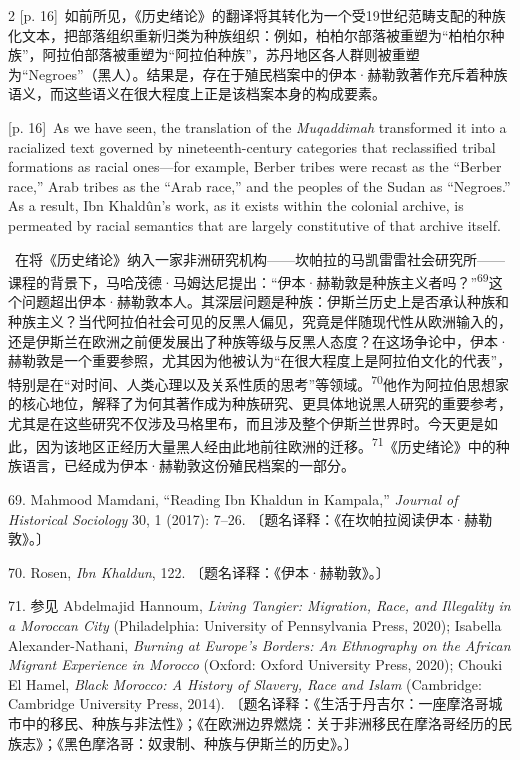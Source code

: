 \documentclass[10pt,a4paper]{article}
\begin{document}
\begin{paracol}{2}
{\scriptsize\color{gray} [p. 16]}\ 如前所见，《历史绪论》的翻译将其转化为一个受19世纪范畴支配的种族化文本，把部落组织重新归类为种族组织：例如，柏柏尔部落被重塑为“柏柏尔种族”，阿拉伯部落被重塑为“阿拉伯种族”，苏丹地区各人群则被重塑为“Negroes”（黑人）。结果是，存在于殖民档案中的伊本·赫勒敦著作充斥着种族语义，而这些语义在很大程度上正是该档案本身的构成要素。\par
\switchcolumn
{\scriptsize\color{gray} [p. 16]}\ As we have seen, the translation of the \textit{Muqaddimah} transformed it into a racialized text governed by nineteenth-century categories that reclassified tribal formations as racial ones—for example, Berber tribes were recast as the “Berber race,” Arab tribes as the “Arab race,” and the peoples of the Sudan as “Negroes.” As a result, Ibn Khaldûn’s work, as it exists within the colonial archive, is permeated by racial semantics that are largely constitutive of that archive itself.\par
\switchcolumn*
{\scriptsize\color{gray} [p. 16]}\ 在将《历史绪论》纳入一家非洲研究机构——坎帕拉的马凯雷雷社会研究所——课程的背景下，马哈茂德·马姆达尼提出：“伊本·赫勒敦是种族主义者吗？”\nobreak\textsuperscript{69}这个问题超出伊本·赫勒敦本人。其深层问题是种族：伊斯兰历史上是否承认种族和种族主义？当代阿拉伯社会可见的反黑人偏见，究竟是伴随现代性从欧洲输入的，还是伊斯兰在欧洲之前便发展出了种族等级与反黑人态度？在这场争论中，伊本·赫勒敦是一个重要参照，尤其因为他被认为“在很大程度上是阿拉伯文化的代表”，特别是在“对时间、人类心理以及关系性质的思考”等领\mbox{域。\textsuperscript{70}}他作为阿拉伯思想家的核心地位，解释了为何其著作成为种族研究、更具体地说黑人研究的重要参考，尤其是在这些研究不仅涉及马格里布，而且涉及整个伊斯兰世界时。今天更是如此，因为该地区正经历大量黑人经由此地前往欧洲的迁\mbox{移。\textsuperscript{71}}《历史绪论》中的种族语言，已经成为伊本·赫勒敦这份殖民档案的一部分。\par{\small 69. Mahmood Mamdani, “Reading Ibn Khaldun in Kampala,” \textit{Journal of Historical Sociology} 30, 1 (2017): 7–26. 〔题名译释：《在坎帕拉阅读伊本·赫勒敦》。〕\par}{\small 70. Rosen, \textit{Ibn Khaldun}, 122. 〔题名译释：《伊本·赫勒敦》。〕\par}{\small 71. 参见 Abdelmajid Hannoum, \textit{Living Tangier: Migration, Race, and Illegality in a Moroccan City} (Philadelphia: University of Pennsylvania Press, 2020); Isabella Alexander-Nathani, \textit{Burning at Europe’s Borders: An Ethnography on the African Migrant Experience in Morocco} (Oxford: Oxford University Press, 2020); Chouki El Hamel, \textit{Black Morocco: A History of Slavery, Race and Islam} (Cambridge: Cambridge University Press, 2014). 〔题名译释：《生活于丹吉尔：一座摩洛哥城市中的移民、种族与非法性》；《在欧洲边界燃烧：关于非洲移民在摩洛哥经历的民族志》；《黑色摩洛哥：奴隶制、种族与伊斯兰的历史》。〕\par}

\end{paracol}
\end{document}
